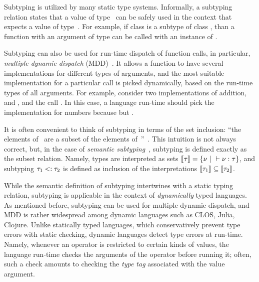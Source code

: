 Subtyping is utilized by many static type systems.
Informally, a subtyping relation  states that
a value of type~ can be safely used
in the context that expects a value of type~.
For example, if class  is a subtype of class ,
than a function with an argument of type 
can be called with an instance of . 

Subtyping can also be used for run-time dispatch of function calls, 
in particular, \emph{multiple dynamic dispatch} 
(MDD)~\cite{bib:Chambers:1992:Cecil,bib:Clifton:2000:MultiJava}.
It allows a function to have several implementations 
for different types of arguments,
and the most suitable implementation for a particular call 
is picked dynamically, based on the run-time types of all arguments.
For example, consider two implementations of addition,
 and ,
and the call .
In this case, a language run-time should pick 
the implementation for numbers 
because  but .

It is often convenient to think of subtyping 
in terms of the set inclusion: ``the elements of~ are a subset
of the elements of~''~\cite{bib:Pierce:2002:TAPL}.
This intuition is not always correct, but, in the case of
\emph{semantic subtyping}~\cite{bib:Hosoya:2003:XDuce,
  bib:Frisch:2008:sem-sub, bib:Ancona:2016:sem-sub-oo}, 
subtyping is defined exactly as the subset relation. %
Namely, types are interpreted as sets
$\llbracket \tau \rrbracket = \{\nu ~\vert~ \vdash \nu : \tau \}$, 
and subtyping $\tau_1 <: \tau_2$ is defined as inclusion 
of the interpretations
$\llbracket \tau_1 \rrbracket \subseteq \llbracket \tau_2 \rrbracket$.

While the semantic definition of subtyping intertwines with 
a static typing relation,
subtyping is applicable in the context of 
\emph{dynamically} typed languages.
As mentioned before, subtyping can be used for multiple dynamic dispatch,
and MDD is rather widespread among dynamic languages
such as CLOS, Julia, Clojure.
Unlike statically typed languages, 
which conservatively prevent type errors with static checking,
dynamic languages detect type errors at run-time.
Namely, whenever an operator is restricted to certain kinds of values,
the language run-time checks the arguments of the operator before running it;
often, such a check amounts to checking the \emph{type tag} associated 
with the value argument.


